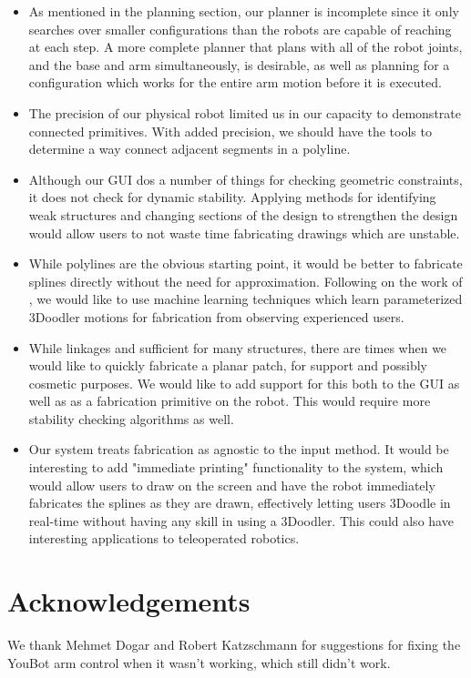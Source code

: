 \documentclass[conference]{acmsiggraph}
\begin{document}
\begin{itemize}
\item As mentioned in the planning section, our planner is incomplete since it only searches over smaller configurations than the robots are capable of reaching at each step.  A more complete planner that plans with all of the robot joints, and the base and arm simultaneously, is desirable, as well as planning for a configuration which works for the entire arm motion before it is executed.

\item The precision of our physical robot limited us in our capacity to demonstrate connected primitives.  With added precision, we should have the tools to determine a way connect adjacent segments in a polyline.

\item Although our GUI dos a number of things for checking geometric constraints, it does not check for dynamic stability.  Applying methods for identifying weak structures and changing sections of the design to strengthen the design would allow users to not waste time fabricating drawings which are unstable.

\item While polylines are the obvious starting point, it would be better to fabricate splines directly without the need for approximation.  Following on the work of \cite{Caligraphy}, we would like to use machine learning techniques which learn parameterized 3Doodler motions for fabrication from observing experienced users.
 
\item While linkages and sufficient for many structures, there are times when we would like to quickly fabricate a planar patch, for support and possibly cosmetic purposes.  We would like to add support for this both to the GUI as well as as a fabrication primitive on the robot.  This would require more stability checking algorithms as well.

\item  Our system treats fabrication as agnostic to the input method.  It would be interesting to add "immediate printing" functionality to the system, which would allow users to draw on the screen and have the robot immediately fabricates the splines as they are drawn, effectively letting users 3Doodle in real-time without having any skill in using a 3Doodler.  This could also have interesting applications to teleoperated robotics.

\end{itemize}

\section*{Acknowledgements}

We thank Mehmet Dogar and Robert Katzschmann for suggestions for fixing the YouBot arm control when it wasn't working, which still didn't work.





\end{document}
